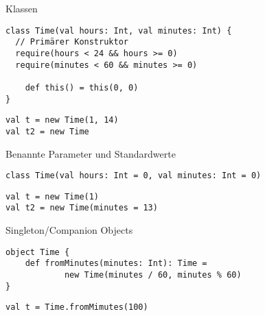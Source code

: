 \documentclass[14pt,aspectratio=169,trans]{beamer} %
\begin{document}
\begin{frame}[fragile]{}
 \begin{block}{Klassen}
\scriptsize
	\onslide<2->
  \begin{lstlisting}
class Time(val hours: Int, val minutes: Int) {
  // Primärer Konstruktor
  require(hours < 24 && hours >= 0)
  require(minutes < 60 && minutes >= 0)
	
	def this() = this(0, 0)
}
	\end{lstlisting}
  \begin{lstlisting}[firstnumber=8]
val t = new Time(1, 14)
val t2 = new Time
	\end{lstlisting}
\end{block}
\end{frame}

\begin{frame}[fragile]{}
 \begin{block}{Benannte Parameter und Standardwerte}
\scriptsize
	\onslide<2->
  \begin{lstlisting}
class Time(val hours: Int = 0, val minutes: Int = 0)

	\end{lstlisting}
  \begin{lstlisting}[firstnumber=2]
val t = new Time(1)
val t2 = new Time(minutes = 13)
	\end{lstlisting}
\end{block}
\end{frame}

\begin{frame}[fragile]{}
 \begin{block}{Singleton/Companion Objects}
\scriptsize
	\onslide<2->
  \begin{lstlisting}
object Time {
	def fromMinutes(minutes: Int): Time = 
			new Time(minutes / 60, minutes % 60)
}

	\end{lstlisting}
  \begin{lstlisting}[firstnumber=5]
val t = Time.fromMimutes(100)
	\end{lstlisting}
\end{block}
\end{frame}
\end{document}
